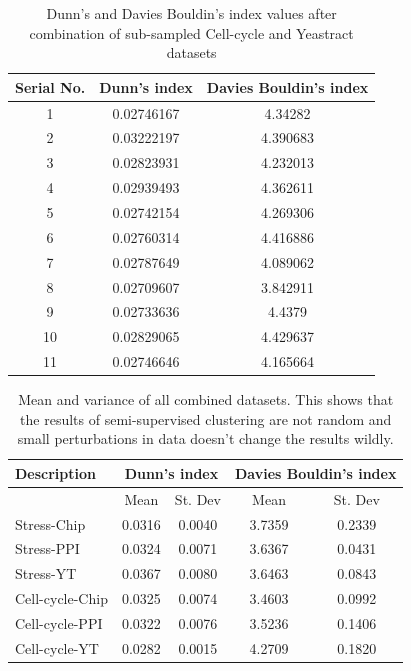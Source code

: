 \begin{table}[p]
\centering
\begin{tabular}{|c|c|c|}
\hline
Serial No. & Dunn’s index  & Davies Bouldin’s index\\
\hline
1 & 0.02746167 & 4.34282 \\
2 & 0.03222197 & 4.390683 \\
3 & 0.02823931 &  4.232013 \\
4 & 0.02939493 &  4.362611 \\
5 & 0.02742154 & 4.269306 \\
6 & 0.02760314 & 4.416886 \\
7 & 0.02787649 & 4.089062 \\
8 & 0.02709607 & 3.842911 \\
9 & 0.02733636 & 4.4379 \\
10 & 0.02829065 & 4.429637 \\
11 & 0.02746646 &  4.165664 \\
\hline 
\end{tabular}
\caption{Dunn's and Davies Bouldin's index values after combination of sub-sampled Cell-cycle and Yeastract datasets}
\label{tab:ccycle_yt_perturbed}
\end{table}

\begin{table}
\centering
\begin{tabular}{|l|c|c|c|c|}
\hline
Description & \multicolumn{2}{|c|}{Dunn’s index}  & \multicolumn{2}{|c|}{Davies Bouldin’s index}\\
\hline
 & Mean & St. Dev & Mean & St. Dev\\
\hline
Stress-Chip & 0.0316 & 0.0040 & 3.7359 & 0.2339 \\
Stress-PPI & 0.0324 & 0.0071 & 3.6367 & 0.0431 \\
Stress-YT & 0.0367 & 0.0080 & 3.6463 & 0.0843 \\

\hline
Cell-cycle-Chip & 0.0325 & 0.0074 & 3.4603 & 0.0992 \\
Cell-cycle-PPI & 0.0322 & 0.0076 & 3.5236 & 0.1406 \\
Cell-cycle-YT & 0.0282 & 0.0015 & 4.2709 & 0.1820 \\
\hline 
\end{tabular}
\caption{Mean and variance of all combined datasets. This shows that the results of semi-supervised clustering are not random and small perturbations in data doesn’t change the results wildly.}
\label{tab:mean_stdev_combined_perturbed}
\end{table}

